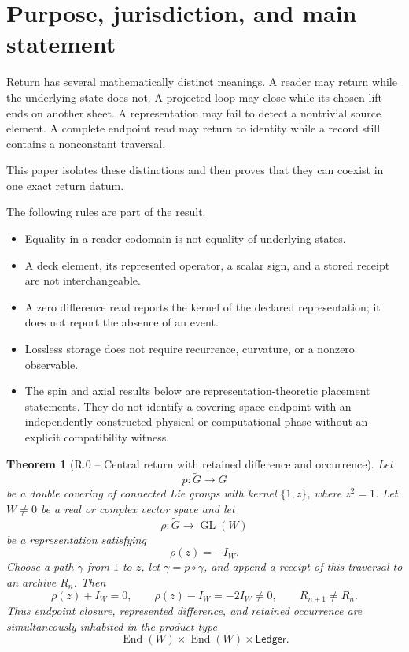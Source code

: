 \documentclass[11pt,letterpaper]{article}
\theoremstyle{returnstyle}
\newtheorem{theorem}{Theorem}[section]
\newcommand{\End}{\operatorname{End}}
\newcommand{\GL}{\operatorname{GL}}
\newcommand{\Ledger}{\mathsf{Ledger}}
\begin{document}
\tableofcontents
\clearpage

\section{Purpose, jurisdiction, and main statement}

Return has several mathematically distinct meanings.  A reader may return while the underlying state does not.  A projected loop may close while its chosen lift ends on another sheet.  A representation may fail to detect a nontrivial source element.  A complete endpoint read may return to identity while a record still contains a nonconstant traversal.

This paper isolates these distinctions and then proves that they can coexist in one exact return datum.

\begin{boundarybox}
The following rules are part of the result.
\begin{itemize}
  \item Equality in a reader codomain is not equality of underlying states.
  \item A deck element, its represented operator, a scalar sign, and a stored receipt are not interchangeable.
  \item A zero difference read reports the kernel of the declared representation; it does not report the absence of an event.
  \item Lossless storage does not require recurrence, curvature, or a nonzero observable.
  \item The spin and axial results below are representation-theoretic placement statements.  They do not identify a covering-space endpoint with an independently constructed physical or computational phase without an explicit compatibility witness.
\end{itemize}
\end{boundarybox}

\begin{theorem}[R.0 -- Central return with retained difference and occurrence]\label{thm:main}
Let
\[
p:\widetilde G\longrightarrow G
\]
be a double covering of connected Lie groups with kernel $\{1,z\}$, where $z^2=1$.  Let $W\ne0$ be a real or complex vector space and let
\[
\rho:\widetilde G\longrightarrow\GL(W)
\]
be a representation satisfying
\[
\rho(z)=-I_W.
\]
Choose a path $\widetilde\gamma$ from $1$ to $z$, let $\gamma=p\circ\widetilde\gamma$, and append a receipt of this traversal to an archive $R_n$.  Then
\[
\rho(z)+I_W=0,
\qquad
\rho(z)-I_W=-2I_W\ne0,
\qquad
R_{n+1}\ne R_n.
\]
Thus endpoint closure, represented difference, and retained occurrence are simultaneously inhabited in the product type
\[
\End(W)\times\End(W)\times\Ledger.
\]
\end{theorem}
\end{document}
